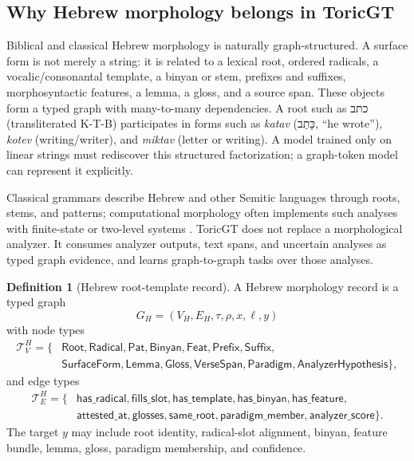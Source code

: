 \documentclass[11pt]{article}
\newcommand{\heb}[1]{{\hebrewfont #1}}
\theoremstyle{definition}
\newtheorem{definition}{Definition}[section]
\theoremstyle{plain}
\theoremstyle{remark}
\numberwithin{equation}{section}
\newcommand{\Root}{\mathsf{Root}}
\newcommand{\Pat}{\mathsf{Pat}}
\newcommand{\Binyan}{\mathsf{Binyan}}
\newcommand{\Feat}{\mathsf{Feat}}
\begin{document}
\subsection{Why Hebrew morphology belongs in ToricGT}

Biblical and classical Hebrew morphology is naturally graph-structured.  A surface form is not merely a string: it is related to a lexical root, ordered radicals, a vocalic/consonantal template, a binyan or stem, prefixes and suffixes, morphosyntactic features, a lemma, a gloss, and a source span.  These objects form a typed graph with many-to-many dependencies.  A root such as \heb{כתב} (transliterated K-T-B) participates in forms such as \emph{katav} (\heb{כָּתַב}, ``he wrote''), \emph{kotev} (writing/writer), and \emph{miktav} (letter or writing).  A model trained only on linear strings must rediscover this structured factorization; a graph-token model can represent it explicitly.

Classical grammars describe Hebrew and other Semitic languages through roots, stems, and patterns; computational morphology often implements such analyses with finite-state or two-level systems \cite{gesenius1910,waltke1990,joüon2006,koskenniemi1983,beesley2003,yona2008}.  ToricGT does not replace a morphological analyzer.  It consumes analyzer outputs, text spans, and uncertain analyses as typed graph evidence, and learns graph-to-graph tasks over those analyses.

\begin{definition}[Hebrew root-template record]
A Hebrew morphology record is a typed graph
\begin{equation}
  G_H=(V_H,E_H,\tau,\rho,x,\ell,y)
\end{equation}
with node types
\begin{equation}
\begin{split}
  \mathcal T_V^H=\{&\Root,\mathsf{Radical},\Pat,\Binyan,\Feat,\mathsf{Prefix},\mathsf{Suffix},\\
  &\mathsf{SurfaceForm},\mathsf{Lemma},\mathsf{Gloss},\mathsf{VerseSpan},\mathsf{Paradigm},\mathsf{AnalyzerHypothesis}\},
\end{split}
\end{equation}
and edge types
\begin{equation}
\begin{split}
  \mathcal T_E^H=\{&\mathsf{has\_radical},\mathsf{fills\_slot},\mathsf{has\_template},\mathsf{has\_binyan},\mathsf{has\_feature},\\
  &\mathsf{attested\_at},\mathsf{glosses},\mathsf{same\_root},\mathsf{paradigm\_member},\mathsf{analyzer\_score}\}.
\end{split}
\end{equation}
The target $y$ may include root identity, radical-slot alignment, binyan, feature bundle, lemma, gloss, paradigm membership, and confidence.
\end{definition}
\end{document}

